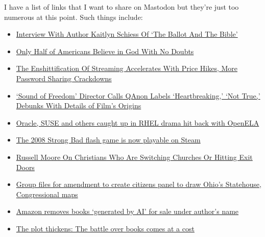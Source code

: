 I have a list of links that I want to share on Mastodon but they're just
too numerous at this point. Such things include:

\begin{itemize}
\tightlist
\item
  \href{https://religionunplugged.com/news/2023/8/7/interview-with-author-kaitlyn-schiess-of-the-ballot-and-the-bible}{Interview
  With Author Kaitlyn Schiess Of `The Ballot And The Bible'}
\item
  \href{https://julieroys.com/only-half-of-americans-believe-in-god-with-no-doubts/}{Only
  Half of Americans Believe in God With No Doubts}
\item
  \href{https://www.techdirt.com/2023/08/14/the-enshittification-of-streaming-accelerates-with-price-hikes-more-password-sharing-crackdowns/}{The
  Enshittification Of Streaming Accelerates With Price Hikes, More
  Password Sharing Crackdowns}
\item
  \href{https://variety.com/2023/film/features/sound-of-freedom-director-controversy-calls-qanon-untrue-1235694549/}{`Sound
  of Freedom' Director Calls QAnon Labels `Heartbreaking,' `Not True,'
  Debunks With Details of Film's Origins}
\item
  \href{https://www.theregister.com/2023/08/14/oracle_suse_ciq_openela/}{Oracle,
  SUSE and others caught up in RHEL drama hit back with OpenELA}
\item
  \href{https://www.techradar.com/gaming/pc-gaming/the-2008-strong-bad-flash-game-is-now-playable-on-steam}{The
  2008 Strong Bad flash game is now playable on Steam}
\item
  \href{https://religionunplugged.com/news/2023/8/7/russell-moore-on-christians-who-are-switching-churches-or-hitting-exit-doors-period}{Russell
  Moore On Christians Who Are Switching Churches Or Hitting Exit Doors}
\item
  \href{https://www.statenews.org/government-politics/2023-08-14/group-files-for-amendment-to-create-citizens-panel-to-draw-ohios-statehouse-congressional-maps}{Group
  files for amendment to create citizens panel to draw Ohio's
  Statehouse, Congressional maps}
\item
  \href{https://www.theguardian.com/books/2023/aug/09/amazon-removes-books-generated-by-ai-for-sale-under-authors-name}{Amazon
  removes books `generated by AI' for sale under author's name}
\item
  \href{https://www.npr.org/2023/08/11/1192034923/the-plot-thickens-the-battle-over-books-comes-at-a-cost}{The
  plot thickens: The battle over books comes at a cost}

\end{itemize}
